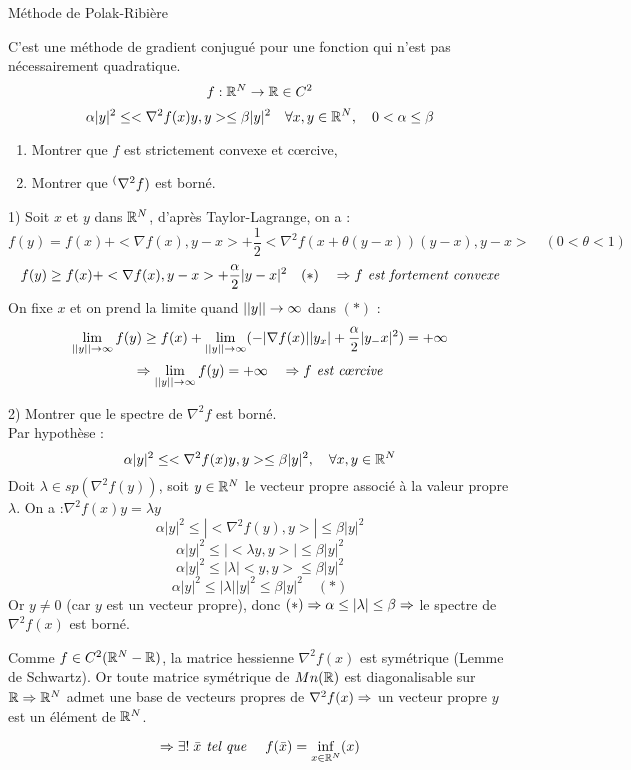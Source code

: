 \begin{exemple}
Méthode de Polak-Ribière

C'est une méthode de gradient conjugué pour une fonction qui n'est pas nécessairement quadratique.
\[ f:\mathbb{R}^N\rightarrow \mathbb{R} \in C^2\]
\[ \alpha |y|^2 \leq <\nabla^2f(x)y, y> \leq \beta |y|^2 \quad \forall x, y \in \mathbb{R}^N, \quad 0<\alpha\leq\beta \]

\begin{enumerate}
\item Montrer que $f$ est strictement convexe et c\oe rcive,
\item Montrer que $\sp(\nabla^2f)$ est borné.
\end{enumerate}

1) Soit $x$ et $y$ dans $\mathbb{R}^N$, d'après Taylor-Lagrange, on a : \[ f(y)=f(x)+<\nabla f(x),y-x>+\frac{1}{2}<\nabla^2 f(x+\theta(y-x))(y-x),y-x> \quad (0<\theta<1) \]
\[ f(y)\geq f(x)+<\nabla f(x),y-x>+\frac{\alpha}{2}|y-x|^2 \quad (*)\quad \Rightarrow f \textit{ est fortement convexe}\]
On fixe $x$ et on prend la limite quand $||y|| \rightarrow \infty$ dans $(*)$ : \[ \lim_{||y|| \rightarrow \infty} f(y) \geq f(x)+\lim_{||y|| \rightarrow \infty}(-|\nabla f(x)||y_x|+\frac{\alpha}{2}|y_-x|^2)=+\infty \]
\[ \Ra \lim_{||y|| \ra \infty} f(y) = +\infty \quad \Ra f \textit{ est c\oe rcive} \]

2) Montrer que le spectre de $\nabla^2f$ est borné.\\
Par hypothèse :
\[ \alpha|y|^2 \leq <\nabla^2 f(x)y,y> \leq \beta|y|^2, \quad \forall x, y\in\mathbb{R}^N \]
Doit $\lambda \in sp(\nabla^2f(y))$, soit $y\in\mathbb{R}^N$ le vecteur propre associé à la valeur propre $\lambda$. On a :$\nabla^2f(x)y=\lambda y$
\[ \alpha|y|^2 \leq |<\nabla^2 f(y),y>| \leq \beta|y|^2 \]
\[ \alpha|y|^2 \leq |<\lambda y,y>| \leq \beta|y|^2 \]
\[ \alpha|y|^2 \leq |\lambda| <y,y> \leq \beta|y|^2 \]
\[ \alpha|y|^2 \leq |\lambda| |y|^2 \leq \beta|y|^2 \quad (*)\]
Or $y\ne0$ (car $y$ est un vecteur propre), donc $(*) \Rightarrow \alpha\le |\lambda|\leq \beta \Rightarrow$ le spectre de $\nabla^2f(x)$ est borné.

\begin{remarque}
Comme $f\in C^2(\mathbb{R}^N-\mathbb{R})$, la matrice hessienne $\nabla^2f(x)$ est symétrique (Lemme de Schwartz). Or toute matrice symétrique de $Mn(\mathbb{R})$ est diagonalisable sur $\mathbb{R} \Rightarrow \mathbb{R}^N$ admet une base de vecteurs propres de $\nabla^2f(x)\Rightarrow$ un vecteur propre $y$ est un élément de $\mathbb{R}^N$.
\end{remarque}

\[ \Rightarrow\exists!\; \bar{x} \textit{ tel que } \quad f(\bar{x})=\inf_{x\in\mathbb{R}^N}(x) \]

\end{exemple}

